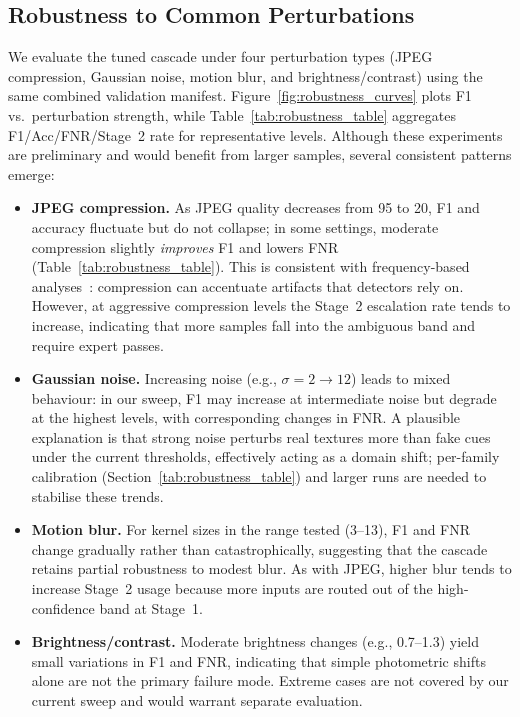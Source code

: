 \subsection{Robustness to Common Perturbations}
\label{subsec:robustness}
We evaluate the tuned cascade under four perturbation types (JPEG compression, Gaussian noise, motion blur, and brightness/contrast) using the same combined validation manifest. Figure~\ref{fig:robustness_curves} plots F1 vs.\ perturbation strength, while Table~\ref{tab:robustness_table} aggregates F1/Acc/FNR/Stage~2 rate for representative levels. Although these experiments are preliminary and would benefit from larger samples, several consistent patterns emerge:
\begin{itemize}[leftmargin=*,itemsep=2pt,parsep=0pt]
  \item \textbf{JPEG compression.} As JPEG quality decreases from 95 to 20, F1 and accuracy fluctuate but do not collapse; in some settings, moderate compression slightly \emph{improves} F1 and lowers FNR (Table~\ref{tab:robustness_table}). This is consistent with frequency\hyp based analyses~\cite{durall2020watch,qian2020thinkingfrequency}: compression can accentuate artifacts that detectors rely on. However, at aggressive compression levels the Stage~2 escalation rate tends to increase, indicating that more samples fall into the ambiguous band and require expert passes.
  \item \textbf{Gaussian noise.} Increasing noise (e.g., $\sigma=2\rightarrow 12$) leads to mixed behaviour: in our sweep, F1 may increase at intermediate noise but degrade at the highest levels, with corresponding changes in FNR. A plausible explanation is that strong noise perturbs real textures more than fake cues under the current thresholds, effectively acting as a domain shift; per\hyp family calibration (Section~\ref{tab:robustness_table}) and larger runs are needed to stabilise these trends.
  \item \textbf{Motion blur.} For kernel sizes in the range tested (3--13), F1 and FNR change gradually rather than catastrophically, suggesting that the cascade retains partial robustness to modest blur. As with JPEG, higher blur tends to increase Stage~2 usage because more inputs are routed out of the high\hyp confidence band at Stage~1.
  \item \textbf{Brightness/contrast.} Moderate brightness changes (e.g., 0.7--1.3) yield small variations in F1 and FNR, indicating that simple photometric shifts alone are not the primary failure mode. Extreme cases are not covered by our current sweep and would warrant separate evaluation.
\end{itemize}
